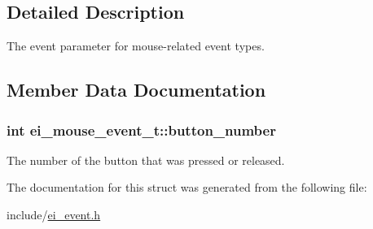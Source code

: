 \subsection{Detailed Description}
The event parameter for mouse-\/related event types. 

\subsection{Member Data Documentation}
\subsubsection[{\texorpdfstring{button\+\_\+number}{button_number}}]{\setlength{\rightskip}{0pt plus 5cm}int ei\+\_\+mouse\+\_\+event\+\_\+t\+::button\+\_\+number}\hypertarget{structei__mouse__event__t_a3165d2e07c861aa9ccb114a10a6b0afb}{}\label{structei__mouse__event__t_a3165d2e07c861aa9ccb114a10a6b0afb}
The number of the button that was pressed or released. 

The documentation for this struct was generated from the following file\+:\begin{DoxyCompactItemize}
\item 
include/\hyperlink{ei__event_8h}{ei\+\_\+event.\+h}\end{DoxyCompactItemize}
